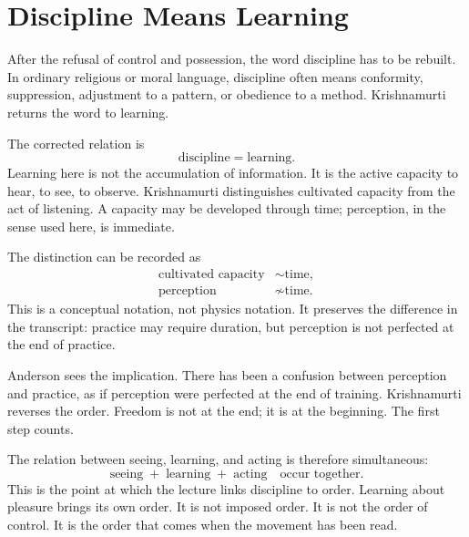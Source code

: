 \section{Discipline Means Learning}

After the refusal of control and possession, the word discipline has to be rebuilt. In ordinary religious or moral language, discipline often means conformity, suppression, adjustment to a pattern, or obedience to a method. Krishnamurti returns the word to learning.

The corrected relation is
\begin{equation}
\text{discipline} = \text{learning}.
\end{equation}
Learning here is not the accumulation of information. It is the active capacity to hear, to see, to observe. Krishnamurti distinguishes cultivated capacity from the act of listening. A capacity may be developed through time; perception, in the sense used here, is immediate.

The distinction can be recorded as
\begin{align}
\text{cultivated capacity} &\sim \text{time},\\
\text{perception} &\not\sim \text{time}.
\end{align}
This is a conceptual notation, not physics notation. It preserves the difference in the transcript: practice may require duration, but perception is not perfected at the end of practice.

Anderson sees the implication. There has been a confusion between perception and practice, as if perception were perfected at the end of training. Krishnamurti reverses the order. Freedom is not at the end; it is at the beginning. The first step counts.

The relation between seeing, learning, and acting is therefore simultaneous:
\begin{equation}
\text{seeing} \;+\; \text{learning} \;+\; \text{acting}
\quad \text{occur together}.
\end{equation}
This is the point at which the lecture links discipline to order. Learning about pleasure brings its own order. It is not imposed order. It is not the order of control. It is the order that comes when the movement has been read.

